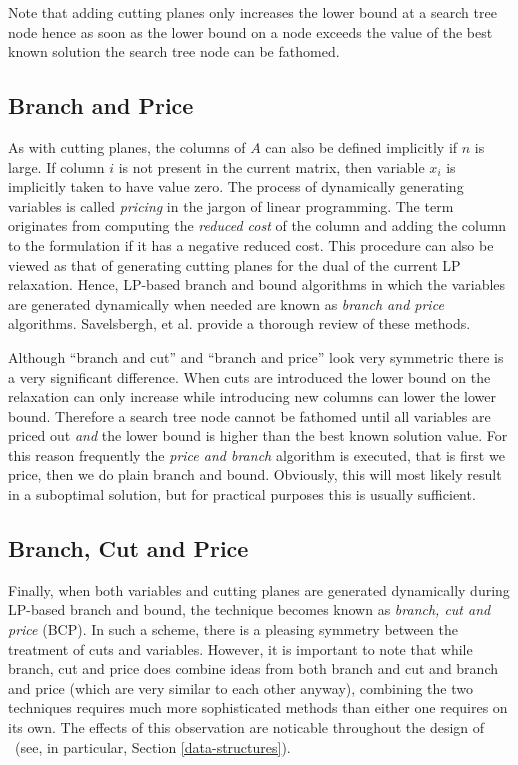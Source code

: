 Note that adding cutting planes only increases the lower bound at a search
tree node hence as soon as the lower bound on a node exceeds the value of the
best known solution the search tree node can be fathomed.

\subsection{Branch and Price}
\label{branchandprice}

As with cutting planes, the columns of $A$ can also be defined
implicitly if $n$ is large. If column $i$ is not present in the
current matrix, then variable $x_i$ is implicitly taken to have value
zero. The process of dynamically generating variables is called {\em
pricing} in the jargon of linear programming. The term originates from
computing the {\em reduced cost} of the column and adding the column to the
formulation if it has a negative reduced cost. This procedure
can also be viewed
as that of generating cutting planes for the dual of the current
LP relaxation. Hence, LP-based branch and bound algorithms in which
the variables are generated dynamically when needed are known as {\em
branch and price} algorithms. Savelsbergh,
et al. \cite{branchandprice} provide a thorough review of these methods. 

Although ``branch and cut'' and ``branch and price'' look very symmetric there
is a very significant difference. When cuts are introduced the lower bound on
the relaxation can only increase while introducing new columns can lower the
lower bound. Therefore a search tree node cannot be fathomed until all
variables are priced out {\em and} the lower bound is higher than the best
known solution value. For this reason frequently the {\em price and branch}
algorithm is executed, that is first we price, then we do plain branch and
bound. Obviously, this will most likely result in a suboptimal solution, but
for practical purposes this is usually sufficient.

\subsection{Branch, Cut and Price}
\label{branchandcutandprice}

Finally, when both variables and cutting planes are generated dynamically
during LP-based branch and bound, the technique becomes known as {\em
branch, cut and price} (BCP). In such a scheme, there is a pleasing
symmetry between the treatment of cuts and variables.
However, it is important to note that while branch, cut and
price does combine ideas from both branch and cut and branch and price
(which are very similar to each other anyway), combining the two
techniques requires much more sophisticated methods than either one
requires on its own. The effects of this observation are noticable throughout
the design of \BB\ (see, in particular, Section \ref{data-structures}).

